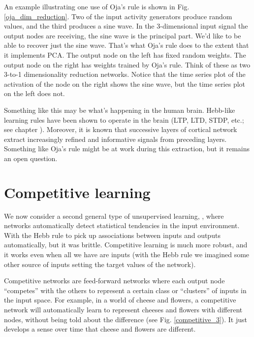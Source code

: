 An example illustrating one use of Oja's rule is shown in Fig. \ref{oja_dim_reduction}. Two of the input activity generators produce random values, and the third produces a sine wave. In the 3-dimensional input signal the output nodes are receiving, the sine wave is the principal part. We'd like to be able to recover just the sine wave. That's what Oja's rule does to the extent that it implements PCA. The output node on the left has fixed random weights. The output node on the right has weights trained by Oja's rule. Think of these as two 3-to-1 dimensionality reduction networks. Notice that the time series plot of the activation of the node on the right shows the sine wave, but the time series plot on the left does not.

Something like this may be what's happening in the human brain. Hebb-like learning rules  have been shown to operate in the brain (LTP, LTD, STDP, etc.; see chapter ). Moreover, it is known that successive layers of cortical network extract increasingly refined and informative signals from preceding layers. Something like Oja's rule might be at work during this extraction, but it remains an open question.


\section{Competitive learning}


We now consider a second general type of unsupervised learning, , where networks automatically detect statistical tendencies in the input environment. With the Hebb rule to pick up associations between inputs and outputs automatically, but it was brittle. Competitive learning is much more robust, and it works even when all we have are inputs (with the Hebb rule we imagined some other source of inputs setting the target values of the network).

Competitive networks are feed-forward networks where each output node ``competes'' with the others to represent a certain class or ``clusters'' of inputs in the input space. For example, in a world of cheese and flowers, a competitive network will automatically learn to represent cheeses and flowers with different nodes, without being told about the difference  (see Fig. \ref{competitive_3}). It just develops a sense over time that cheese and flowers are different. 

